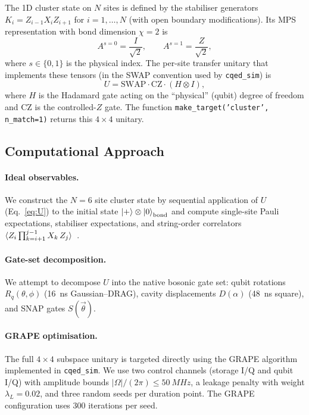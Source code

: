 \documentclass[aps,pra,twocolumn,reprint,floatfix,amsmath,amssymb]{revtex4-2}
\begin{document}
The 1D cluster state on $N$ sites is defined by the stabiliser
generators $K_i = Z_{i-1}X_iZ_{i+1}$ for $i=1,\ldots,N$ (with open
boundary modifications).  Its MPS representation with bond
dimension $\chi=2$ is~\cite{perez2007matrix}
\begin{equation}
  A^{s=0} = \frac{I}{\sqrt{2}},\qquad
  A^{s=1} = \frac{Z}{\sqrt{2}},
  \label{eq:mps}
\end{equation}
where $s\in\{0,1\}$ is the physical index.  The per-site transfer
unitary that implements these tensors (in the SWAP convention used
by \texttt{cqed\_sim}) is
\begin{equation}
  U = \mathrm{SWAP}\cdot\mathrm{CZ}\cdot(H\otimes I),
  \label{eq:U}
\end{equation}
where $H$ is the Hadamard gate acting on the ``physical'' (qubit)
degree of freedom and $\mathrm{CZ}$ is the controlled-$Z$ gate.
The function \texttt{make\_target('cluster', n\_match=1)} returns
this $4\times4$ unitary.

\subsection{Computational Approach}

\paragraph{Ideal observables.}
We construct the $N=6$ site cluster state by sequential application
of $U$ (Eq.~\ref{eq:U}) to the initial state
$\ket{+}\otimes\ket{0}_\mathrm{bond}$ and compute single-site Pauli
expectations, stabiliser expectations, and string-order correlators
$\braket{Z_i\prod_{k=i+1}^{j-1}X_k\,Z_j}$~\cite{den2012symmetry,pollmann2012detection}.

\paragraph{Gate-set decomposition.}
We attempt to decompose $U$ into the native bosonic gate set:
qubit rotations $R_q(\theta,\phi)$ (\SI{16}{ns} Gaussian--DRAG),
cavity displacements $D(\alpha)$ (\SI{48}{ns} square), and SNAP
gates $S(\vec\theta)$.

\paragraph{GRAPE optimisation.}
The full $4{\times}4$ subspace unitary is targeted directly using
the GRAPE algorithm~\cite{khaneja2005optimal} implemented in
\texttt{cqed\_sim}.  We use two control channels (storage I/Q and
qubit I/Q) with amplitude bounds
$|\Omega|/(2\pi)\leq\SI{50}{MHz}$, a leakage penalty with weight
$\lambda_L=0.02$, and three random seeds per duration point.
The GRAPE configuration uses 300 iterations per seed.
\end{document}
